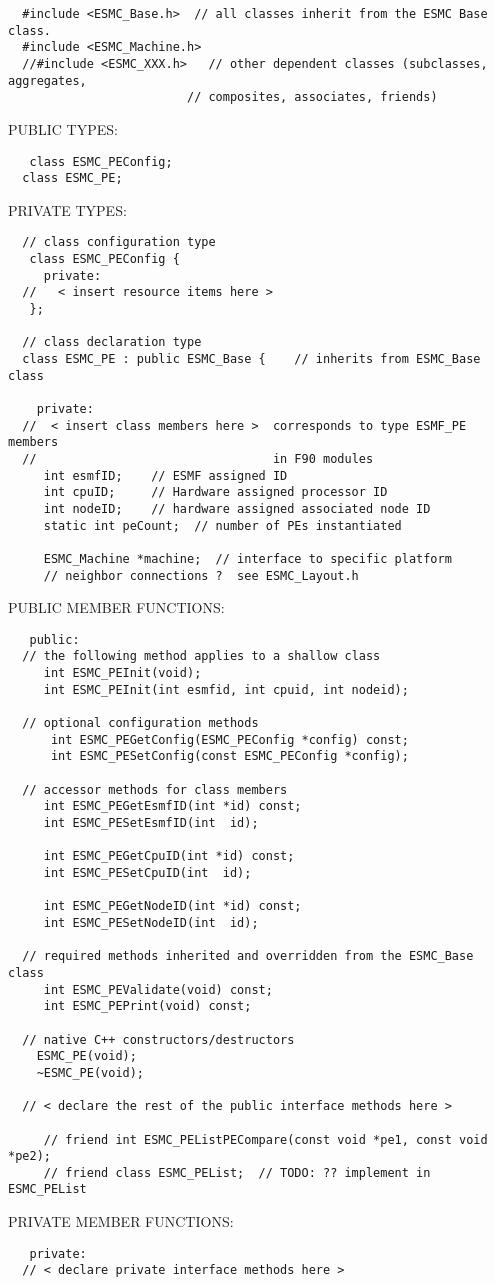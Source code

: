 \begin{verbatim}  #include <ESMC_Base.h>  // all classes inherit from the ESMC Base class.
  #include <ESMC_Machine.h>  
  //#include <ESMC_XXX.h>   // other dependent classes (subclasses, aggregates,
                         // composites, associates, friends)
 \end{verbatim}{\sf PUBLIC TYPES:}
\begin{verbatim}   class ESMC_PEConfig;
  class ESMC_PE;
 \end{verbatim}{\sf PRIVATE TYPES:}
\begin{verbatim} 
  // class configuration type
   class ESMC_PEConfig {
     private:
  //   < insert resource items here >
   };
 
  // class declaration type
  class ESMC_PE : public ESMC_Base {    // inherits from ESMC_Base class
 
    private:
  //  < insert class members here >  corresponds to type ESMF_PE members
  //                                 in F90 modules
     int esmfID;    // ESMF assigned ID
     int cpuID;     // Hardware assigned processor ID
     int nodeID;    // hardware assigned associated node ID
     static int peCount;  // number of PEs instantiated
 
     ESMC_Machine *machine;  // interface to specific platform
     // neighbor connections ?  see ESMC_Layout.h
 \end{verbatim}{\sf PUBLIC MEMBER FUNCTIONS:}
\begin{verbatim}   public:
  // the following method applies to a shallow class
     int ESMC_PEInit(void);
     int ESMC_PEInit(int esmfid, int cpuid, int nodeid);
 
  // optional configuration methods
      int ESMC_PEGetConfig(ESMC_PEConfig *config) const;
      int ESMC_PESetConfig(const ESMC_PEConfig *config);
 
  // accessor methods for class members
     int ESMC_PEGetEsmfID(int *id) const;
     int ESMC_PESetEsmfID(int  id);
 
     int ESMC_PEGetCpuID(int *id) const;
     int ESMC_PESetCpuID(int  id);
 
     int ESMC_PEGetNodeID(int *id) const;
     int ESMC_PESetNodeID(int  id);
     
  // required methods inherited and overridden from the ESMC_Base class
     int ESMC_PEValidate(void) const;
     int ESMC_PEPrint(void) const;
 
  // native C++ constructors/destructors
 	ESMC_PE(void);
 	~ESMC_PE(void);
   
  // < declare the rest of the public interface methods here >
 
     // friend int ESMC_PEListPECompare(const void *pe1, const void *pe2);
     // friend class ESMC_PEList;  // TODO: ?? implement in ESMC_PEList
   \end{verbatim}{\sf PRIVATE MEMBER FUNCTIONS:}
\begin{verbatim}   private: 
  // < declare private interface methods here >\end{verbatim}

